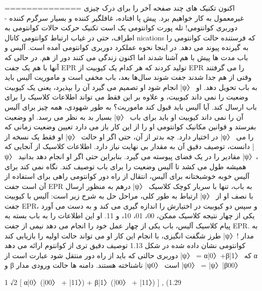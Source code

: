 \documentclass{book}
\begin{document}
==============
اکنون تکنیک های چند صفحه آخر را برای درک چیزی غیرمعمول به کار خواهیم برد.
پیش پا افتاده، غافلگیر کننده و بسیار سرگرم کننده - دوربری کوانتومی! تله پورت کوانتومی یک است
تکنیک حرکت حالات کوانتومی به اطراف، حتی در غیاب ارتباط کوانتومی
کانال nications که فرستنده حالت کوانتومی را به گیرنده پیوند می دهد.
در اینجا نحوه عملکرد دوربری کوانتومی آمده است. آلیس و باب مدت ها پیش با هم آشنا شدند اما اکنون زندگی می کنند
دور از هم. در حالی که آنها با هم یک جفت EPR تولید کردند که هر کدام یک کیوبیت از EPR را می گرفتند
وقتی از هم جدا شدند جفت شوند سال‌ها بعد، باب مخفی است و ماموریت آلیس باید انجام شود
او تصمیم می گیرد آن را بپذیرد، یعنی یک کیوبیت |ψ〉 به باب تحویل دهد. او وضعیت را نمی داند
کیوبیت، و علاوه بر این فقط می تواند اطلاعات کلاسیک را برای باب ارسال کند. آیا آلیس باید قبول کند
ماموریت؟
به طور شهودی، همه چیز برای آلیس بسیار بد به نظر می رسد. او وضعیت |ψ〉 آن را نمی داند
کیوبیت او باید برای باب بفرستد و قوانین مکانیک کوانتومی او را از این کار باز می دارد
تعیین وضعیت زمانی که او فقط یک نسخه از |ψ〉 در اختیار دارد. چه
بدتر از آن، حتی اگر او حالت |ψ〉 را می دانست، توصیف دقیق آن به مقدار بی نهایت نیاز دارد.
اطلاعات کلاسیک از آنجایی که |ψ〉 مقادیر را در یک فضای پیوسته می گیرد. بنابراین حتی اگر او انجام دهد
بدانید |ψ〉، همیشه طول می کشد تا آلیس وضعیت را برای باب توصیف کند. نگاه نمی کند
برای آلیس خوبه خوشبختانه برای آلیس، انتقال از راه دور کوانتومی راهی برای استفاده از آن است
جفت EPR درهم به منظور ارسال |ψ〉 به باب، تنها با سربار کوچک کلاسیک
ارتباط
به طور کلی، مراحل حل به شرح زیر است: آلیس با کیوبیت |ψ〉 با
نصف او از جفت EPR، و سپس دو کیوبیت در اختیارش را اندازه گیری می کند و به دست می آورد
یکی از چهار نتیجه کلاسیک ممکن، 00، 01، 10، و 11. او این اطلاعات را به
باب بسته به پیام کلاسیک آلیس، باب یکی از چهار عمل خود را انجام می دهد
نیمی از جفت EPR. به طرز شگفت انگیزی، با انجام این کار او می تواند حالت اولیه را بازیابی کند |ψ〉!
مدار کوانتومی نشان داده شده در شکل 1.13 توصیف دقیق تری از کوانتوم ارائه می دهد
دوربری حالتی که باید از راه دور منتقل شود عبارت است از |ψ〉 = α|0〉+β|1〉 که α و β ناشناخته هستند.
دامنه ها حالت ورودی مدار |ψ0〉 است
|ψ0〉 = |ψ〉|β00〉





 1
√2
[
α|0〉(|00〉 + |11〉) + β|1〉(|00〉 + |11〉)
]
, (1.29
\\
\end{document}
